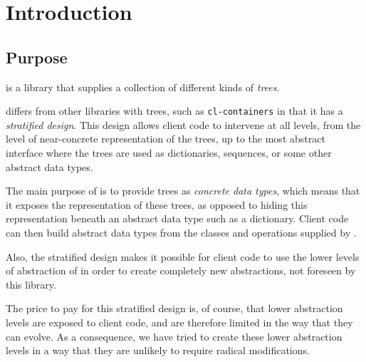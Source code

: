 \chapter{Introduction}
%

\section{Purpose}

\sysname{} is a library that supplies a collection of different kinds
of \emph{trees}.

\sysname{} differs from other libraries with trees, such as
\texttt{cl-containers} in that it has a \emph{stratified design}.
This design allows client code to intervene at all levels, from the
level of near-concrete representation of the trees, up to the most
abstract interface where the trees are used as dictionaries,
sequences, or some other abstract data types.

The main purpose of \sysname{} is to provide trees as \emph{concrete
  data types}, which means that it exposes the representation of these
trees, as opposed to hiding this representation beneath an abstract
data type such as a dictionary.  Client code can then build abstract
data types from the classes and operations supplied by \sysname{}.

Also, the stratified design makes it possible for client code to use
the lower levels of abstraction of \sysname{} in order to create
completely new abstractions, not foreseen by this library.

The price to pay for this stratified design is, of course, that lower
abstraction levels are exposed to client code, and are therefore
limited in the way that they can evolve.  As a consequence, we have
tried to create these lower abstraction levels in a way that they are
unlikely to require radical modifications.
